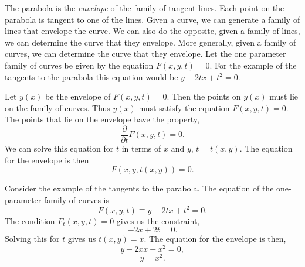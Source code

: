 
The parabola is the \textit{envelope} of the family of tangent lines.  
Each point on the parabola is tangent to one of the lines.
Given a curve, we can generate a family of lines that envelope the curve.
We can also do the opposite, given a family of lines, we can determine the
curve that they envelope.  More generally, given a family of curves, 
we can determine the curve that they envelope.  Let the one parameter
family of curves be given by the equation $F(x,y,t) = 0$.  For the 
example of the tangents to the parabola this equation would be
$y - 2 t x + t^2 = 0$.


Let $y(x)$ be the envelope of $F(x,y,t)=0$.  Then the points on $y(x)$ 
must lie on the family of curves.  Thus $y(x)$ must satisfy the 
equation $F(x,y,t)=0$.  The points that lie on the envelope have the 
property,
\[
\frac{\partial}{\partial t} F(x,y,t) = 0.
\]
We can solve this equation for $t$ in terms of $x$ and $y$, $t=t(x,y)$.
The equation for the envelope is then
\[
F(x,y,t(x,y)) = 0.
\]

Consider the example of the tangents to the parabola.  The equation of
the one-parameter family of curves is
\[
F(x,y,t) \equiv y - 2 t x + t^2 = 0.
\]
The condition $F_t(x,y,t)=0$ gives us the constraint,
\[
-2 x + 2 t = 0.
\]
Solving this for $t$ gives us $t(x,y) = x$.  The equation for the 
envelope is then,
\[
y - 2 x x + x^2 = 0,
\]
\[
y = x^2.
\]




